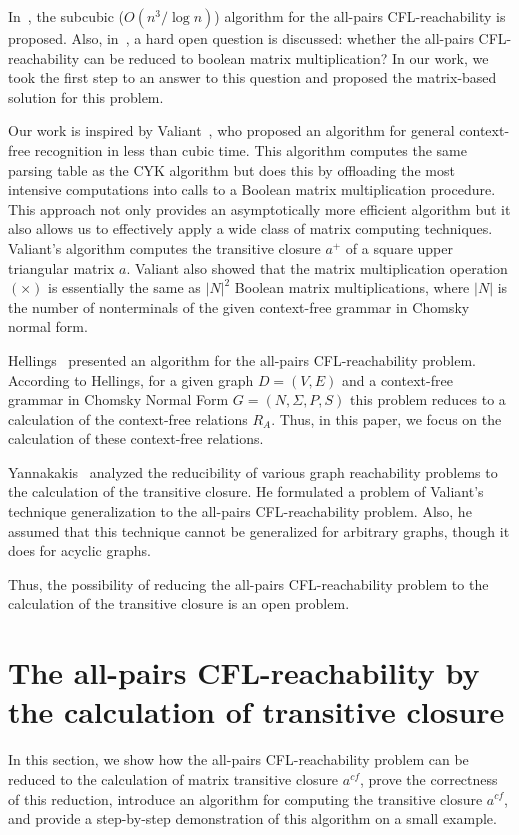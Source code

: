 \documentclass[runningheads,a4paper]{llncs}
\begin{document}
In~\cite{chaudhuri2008subcubic}, the subcubic ($O(n^3/\log{}n)$) algorithm for the all-pairs CFL-reachability is proposed. Also, in~\cite{chaudhuri2008subcubic}, a hard open question is discussed: whether the all-pairs CFL-reachability can be
reduced to boolean matrix multiplication? In our work, we took the first step to an answer to this question and proposed the matrix-based solution for this problem.

Our work is inspired by Valiant~\cite{valiant}, who proposed an algorithm for general context-free recognition in less than cubic time. This algorithm computes the same parsing table as the CYK algorithm but does this by offloading the most intensive computations into calls to a Boolean matrix multiplication procedure. This approach not only provides an asymptotically more efficient algorithm but it also allows us to effectively apply a wide class of matrix computing techniques. Valiant's algorithm computes the transitive closure $a^+$ of a square upper triangular matrix $a$. Valiant also showed that the matrix multiplication operation $(\times)$ is essentially the same as $|N|^2$ Boolean matrix multiplications, where $|N|$ is the number of nonterminals of the given context-free grammar in Chomsky normal form.

Hellings~\cite{hellingsRelational} presented an algorithm for the all-pairs CFL-reachability problem. According to Hellings, for a given graph $D = (V, E)$ and a context-free grammar in Chomsky Normal Form $G = (N, \Sigma, P, S)$ this problem reduces to a calculation of the context-free relations $R_A$. Thus, in this paper, we focus on the calculation of these context-free relations.

Yannakakis~\cite{transitive-closure} analyzed the reducibility of various graph reachability problems to the calculation of the transitive closure. He formulated a problem of Valiant's technique generalization to the all-pairs CFL-reachability problem. Also, he assumed that this technique cannot be generalized for arbitrary graphs, though it does for acyclic graphs.

Thus, the possibility of reducing the all-pairs CFL-reachability problem to the calculation of the transitive closure is an open problem.

\section{The all-pairs CFL-reachability by the calculation of transitive closure}%
In this section, we show how the all-pairs CFL-reachability problem can be reduced to the calculation of matrix transitive closure $a^{cf}$, prove the correctness of this reduction, introduce an algorithm for computing the transitive closure $a^{cf}$, and provide a step-by-step demonstration of this algorithm on a small example.
\end{document}
